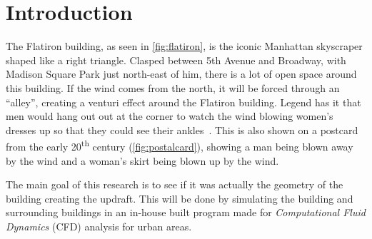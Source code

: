 \section{Introduction}
\label{intro}
The Flatiron building, as seen in \autoref{fig:flatiron}, is the iconic Manhattan skyscraper shaped like a right triangle. Clasped between 5th Avenue and Broadway, with Madison Square Park just north-east of him, there is a lot of open space around this building. If the wind comes from the north, it will be forced through an ``alley'', creating a venturi effect around the Flatiron building. Legend has it that men would hang out out at the corner to watch the wind blowing women's dresses up so that they could see their ankles~\cite{dresses}. This is also shown on a postcard from the early 20\textsuperscript{th} century (\autoref{fig:postalcard}), showing a man being blown away by the wind and a woman's skirt being blown up by the wind.  

The main goal of this research is to see if it was actually the geometry of the building creating the updraft. This will be done by simulating the building and surrounding buildings in an in-house built program made for \emph{Computational Fluid Dynamics} (CFD) analysis for urban areas.

